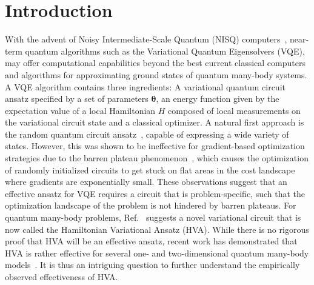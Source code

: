 \documentclass[
 aps,
 pra,
 showpacs,
 showkeys,
 superscriptaddress,
 reprint,%
twocolumn,
]{revtex4-1}
\begin{document}
\section{Introduction}

With the advent of Noisy Intermediate-Scale Quantum (NISQ) computers~\cite{Preskill2018nisq}, near-term quantum algorithms such as the Variational Quantum Eigensolvers (VQE), may offer computational capabilities beyond the best current classical computers and algorithms for approximating ground states of quantum many-body systems. A VQE algorithm contains three ingredients: A variational quantum circuit ansatz specified by a set of parameters $\bm{\theta}$, an energy function given by the expectation value of a local Hamiltonian $H$ composed of local measurements on the variational circuit state and a classical optimizer. A natural first approach is the random quantum circuit ansatz~\cite{Kandala2017hwefficient, Sim2019expressibility, bravoprieto2020scaling}, capable of expressing a wide variety of states. However, this was shown to be ineffective for gradient-based optimization strategies due to the barren plateau phenomenon~\cite{McClean2018barren, sharma2020trainability, volkoff2020large, cerezo2020costfunctiondependent}, which causes the optimization of randomly initialized circuits to get stuck on flat areas in the cost landscape where gradients are exponentially small. These observations suggest that an effective ansatz for VQE requires a circuit that is problem-specific, such that the optimization landscape of the problem is not hindered by barren plateaus.  For quantum many-body problems,  Ref.~\cite{Wecker2015} suggests a novel variational circuit that is now called the Hamiltonian Variational Ansatz (HVA). While there is no rigorous proof that HVA will be an effective ansatz, recent work has demonstrated that HVA is rather effective for several one- and two-dimensional quantum many-body models~\cite{Ho2019, Cade2019}. It is thus an intriguing question to further understand the empirically observed effectiveness of HVA. 
\end{document}
